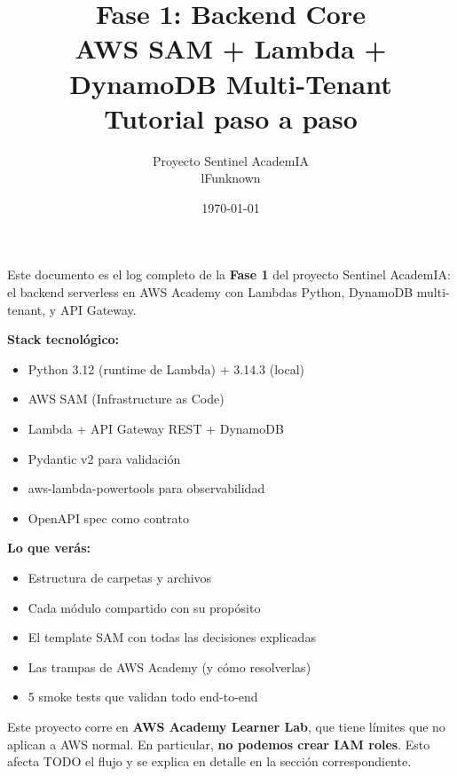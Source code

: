 \documentclass[11pt,a4paper,oneside]{article}
\title{\Huge\textbf{Fase 1: Backend Core} \\[0.3em]
       \Large AWS SAM + Lambda + DynamoDB Multi-Tenant \\[0.5em]
       \normalsize Tutorial paso a paso}
\author{Proyecto Sentinel AcademIA \\ \small lFunknown}
\date{\today}
\begin{document}
\maketitle
\thispagestyle{empty}

\begin{tcolorbox}[colback=blue!5!white,colframe=infoblue,title={\textbf{¿Qué construimos en este tutorial?}}]
Este documento es el log completo de la \textbf{Fase 1} del proyecto Sentinel AcademIA: el backend serverless en AWS Academy con Lambdas Python, DynamoDB multi-tenant, y API Gateway.

\textbf{Stack tecnol\'ogico:}
\begin{itemize}
  \item Python 3.12 (runtime de Lambda) + 3.14.3 (local)
  \item AWS SAM (Infrastructure as Code)
  \item Lambda + API Gateway REST + DynamoDB
  \item Pydantic v2 para validaci\'on
  \item aws-lambda-powertools para observabilidad
  \item OpenAPI spec como contrato
\end{itemize}

\textbf{Lo que ver\'as:}
\begin{itemize}
  \item Estructura de carpetas y archivos
  \item Cada m\'odulo compartido con su prop\'osito
  \item El template SAM con todas las decisiones explicadas
  \item Las trampas de AWS Academy (y c\'omo resolverlas)
  \item 5 smoke tests que validan todo end-to-end
\end{itemize}
\end{tcolorbox}

\begin{tcolorbox}[colback=warnorange!5!white,colframe=warnorange,title={\textbf{Aviso: AWS Academy es restrictivo}}]
Este proyecto corre en \textbf{AWS Academy Learner Lab}, que tiene l\'imites que no aplican a AWS normal. En particular, \textbf{no podemos crear IAM roles}. Esto afecta TODO el flujo y se explica en detalle en la secci\'on correspondiente.
\end{tcolorbox}

\tableofcontents
\newpage

\end{document}
